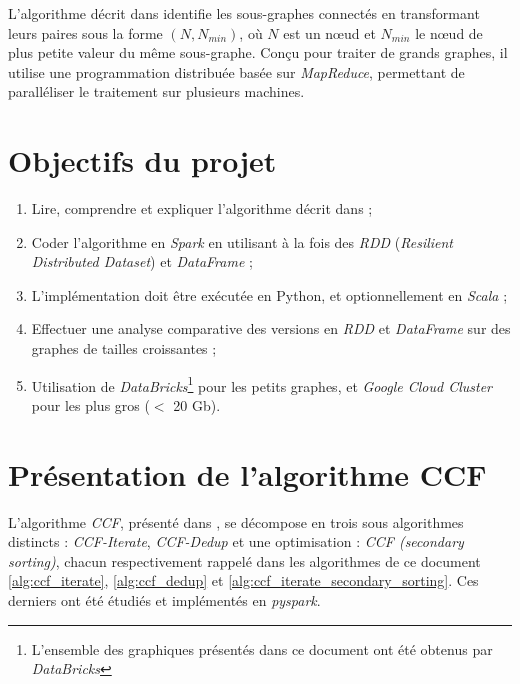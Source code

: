 \documentclass[conference]{IEEEtran}
\begin{document}
L'algorithme décrit dans \cite{6785473} identifie les sous-graphes connectés en transformant leurs paires sous la forme $(N, N_{min})$, où $N$ est un nœud et $N_{min}$ le nœud de plus petite valeur du même sous-graphe. Conçu pour traiter de grands graphes, il utilise une programmation distribuée basée sur \textit{MapReduce}, permettant de paralléliser le traitement sur plusieurs machines.

\section{Objectifs du projet}
\begin{enumerate}
    \item Lire, comprendre et expliquer l'algorithme décrit dans \cite{6785473} ;
    \item Coder l'algorithme en \textit{Spark} en utilisant à la fois des \textit{RDD} (\textit{Resilient Distributed Dataset}) et \textit{DataFrame} ;
    \item L'implémentation doit être exécutée en Python, et optionnellement en \textit{Scala} ;
    \item Effectuer une analyse comparative des versions en \textit{RDD} et \textit{DataFrame} sur des graphes de tailles croissantes ;
    \item Utilisation de \textit{DataBricks}\footnote{L'ensemble des graphiques présentés dans ce document ont été obtenus par \textit{DataBricks}} pour les petits graphes, et \textit{Google Cloud Cluster} pour les plus gros ($<$ 20 Gb).
\end{enumerate}

\section{Présentation de l'algorithme CCF}

L'algorithme \textit{CCF}, présenté dans \cite{6785473}, se décompose en trois sous algorithmes distincts : \textit{CCF-Iterate}, \textit{CCF-Dedup} et une optimisation : \textit{CCF (secondary sorting)}, chacun respectivement rappelé dans les algorithmes de ce document \ref{alg:ccf_iterate}, \ref{alg:ccf_dedup} et \ref{alg:ccf_iterate_secondary_sorting}. Ces derniers ont été étudiés et implémentés en \textit{pyspark}.
\end{document}

